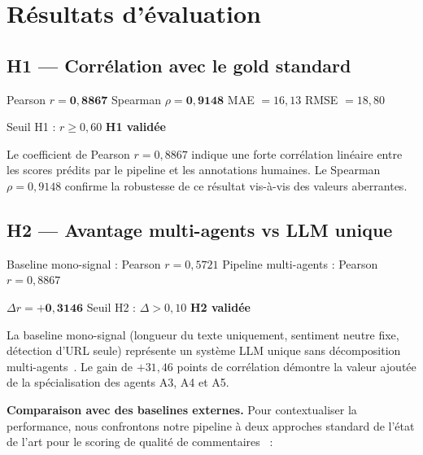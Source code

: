 \documentclass[12pt, a4paper]{article}
\begin{document}
\section{Résultats d'évaluation}

\subsection{H1 — Corrélation avec le gold standard}

\begin{boiteresultat}
  Pearson $r = \mathbf{0{,}8867}$ \quad Spearman $\rho = \mathbf{0{,}9148}$
  \quad MAE $= 16{,}13$ \quad RMSE $= 18{,}80$

  Seuil H1 : $r \geq 0{,}60$ \quad \textcolor{green!60!black}{\textbf{H1 validée}}
\end{boiteresultat}

Le coefficient de Pearson $r = 0{,}8867$ indique une forte corrélation linéaire
entre les scores prédits par le pipeline et les annotations humaines.
Le Spearman $\rho = 0{,}9148$ confirme la robustesse de ce résultat vis-à-vis
des valeurs aberrantes.

\subsection{H2 — Avantage multi-agents vs LLM unique}

\begin{boiteresultat}
  Baseline mono-signal : Pearson $r = 0{,}5721$ \quad
  Pipeline multi-agents : Pearson $r = 0{,}8867$

  $\Delta r = +\mathbf{0{,}3146}$ \quad Seuil H2 : $\Delta > 0{,}10$
  \quad \textcolor{green!60!black}{\textbf{H2 validée}}
\end{boiteresultat}

La baseline mono-signal (longueur du texte uniquement, sentiment neutre fixe,
détection d'URL seule) représente un système LLM unique sans décomposition
multi-agents~\cite{hong2023metagpt}. Le gain de $+31{,}46$ points de corrélation
démontre la valeur ajoutée de la spécialisation des agents A3, A4 et A5.

\textbf{Comparaison avec des baselines externes.}
Pour contextualiser la performance, nous confrontons notre pipeline à deux approches
standard de l'état de l'art pour le scoring de qualité de commentaires~\cite{hutto2014vader,park2016comment} :
\end{document}
